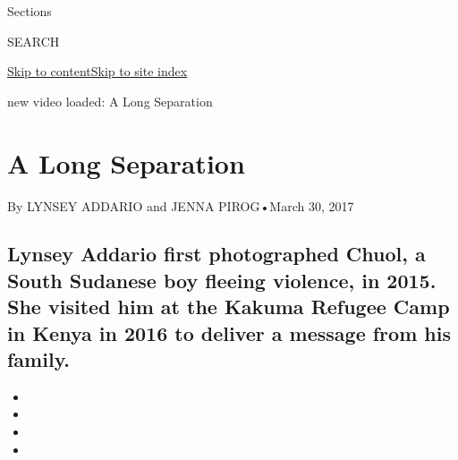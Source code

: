 Sections

SEARCH

\protect\hyperlink{site-content}{Skip to
content}\protect\hyperlink{site-index}{Skip to site index}

new video loaded: A Long Separation

\hypertarget{a-long-separation}{%
\section{A Long Separation}\label{a-long-separation}}

By LYNSEY ADDARIO and JENNA PIROG•March 30, 2017

\hypertarget{lynsey-addario-first-photographed-chuol-a-south-sudanese-boy-fleeing-violence-in-2015-she-visited-him-at-the-kakuma-refugee-camp-in-kenya-in-2016-to-deliver-a-message-from-his-family}{%
\subsection{Lynsey Addario first photographed Chuol, a South Sudanese
boy fleeing violence, in 2015. She visited him at the Kakuma Refugee
Camp in Kenya in 2016 to deliver a message from his
family.}\label{lynsey-addario-first-photographed-chuol-a-south-sudanese-boy-fleeing-violence-in-2015-she-visited-him-at-the-kakuma-refugee-camp-in-kenya-in-2016-to-deliver-a-message-from-his-family}}

\begin{itemize}
\item
\item
\item
\item
\end{itemize}


